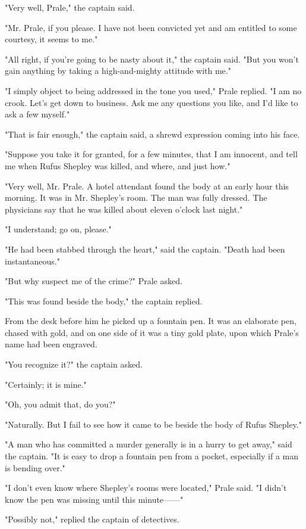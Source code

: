 \documentclass{novel}
\begin{document}
"Very well, Prale," the captain said.

"Mr. Prale, if you please. I have not been convicted yet and am entitled to some courtesy, it seems to me."

"All right, if you're going to be nasty about it," the captain said. "But you won't gain anything by taking a high-and-mighty attitude with me."

"I simply object to being addressed in the tone you used," Prale replied. "I am no crook. Let's get down to business. Ask me any questions you like, and I'd like to ask a few myself."

"That is fair enough," the captain said, a shrewd expression coming into his face.

"Suppose you take it for granted, for a few minutes, that I am innocent, and tell me when Rufus Shepley was killed, and where, and just how."

"Very well, Mr. Prale. A hotel attendant found the body at an early hour this morning. It was in Mr. Shepley's room. The man was fully dressed. The physicians say that he was killed about eleven o'clock last night."

"I understand; go on, please."

"He had been stabbed through the heart," said the captain. "Death had been instantaneous."

"But why suspect me of the crime?" Prale asked.

"This was found beside the body," the captain replied.

From the desk before him he picked up a fountain pen. It was an elaborate pen, chased with gold, and on one side of it was a tiny gold plate, upon which Prale's name had been engraved.

"You recognize it?" the captain asked.

"Certainly; it is mine."

"Oh, you admit that, do you?"

"Naturally. But I fail to see how it came to be beside the body of Rufus Shepley."

"A man who has committed a murder generally is in a hurry to get away," said the captain. "It is easy to drop a fountain pen from a pocket, especially if a man is bending over."

"I don't even know where Shepley's rooms were located," Prale said. "I didn't know the pen was missing until this minute------"

"Possibly not," replied the captain of detectives.
\end{document}
